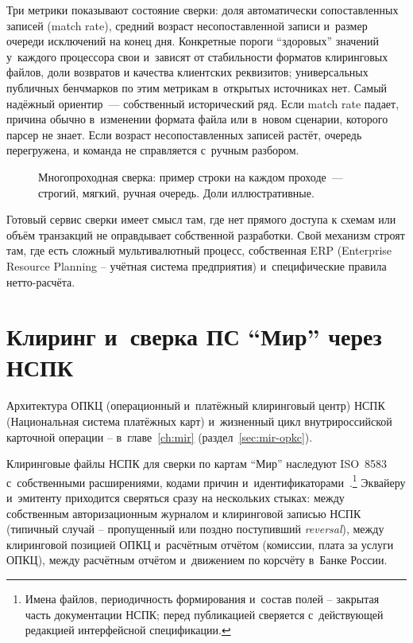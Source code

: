 Три метрики показывают состояние сверки: доля автоматически
сопоставленных записей (match rate), средний возраст
несопоставленной записи и~размер очереди исключений на конец
дня. Конкретные пороги \enquote{здоровых} значений у~каждого
процессора свои и~зависят от стабильности форматов клиринговых
файлов, доли возвратов и качества клиентских реквизитов;
универсальных публичных бенчмарков по этим метрикам в~открытых
источниках нет. Самый надёжный ориентир~--- собственный исторический
ряд. Если match rate падает, причина обычно в~изменении формата
файла или в~новом сценарии, которого парсер не знает. Если
возраст несопоставленных записей растёт, очередь перегружена,
и команда не справляется с~ручным разбором.

\begin{figure}[tbp]
  \centering
  \caption{Многопроходная сверка: пример строки на каждом проходе~--- строгий, мягкий, ручная очередь. Доли иллюстративные.}\label{fig:matching-passes}
\end{figure}

Готовый сервис сверки имеет смысл там, где нет прямого доступа к
схемам или объём транзакций не оправдывает собственной разработки.
Свой механизм строят там, где есть сложный мультивалютный
процесс, собственная ERP (Enterprise Resource Planning -- учётная
система предприятия) и~специфические правила нетто-расчёта.


\section{Клиринг и~сверка ПС \enquote{Мир} через НСПК}\label{sec:recon-mir}

Архитектура ОПКЦ (операционный и~платёжный клиринговый центр) НСПК
(Национальная система платёжных карт) и~жизненный цикл внутрироссийской
карточной операции -- в~главе~\ref{ch:mir} (раздел~\ref{sec:mir-opkc}).

Клиринговые файлы НСПК для сверки по картам \enquote{Мир} наследуют ISO~8583 с~собственными расширениями, кодами причин и~идентификаторами~\cite{nspk-mir-rules}.\footnote{Имена файлов, периодичность формирования и~состав полей -- закрытая часть документации НСПК; перед публикацией сверяется с~действующей редакцией интерфейсной спецификации.} Эквайеру
и~эмитенту приходится сверяться сразу на нескольких стыках: между
собственным авторизационным журналом и клиринговой записью НСПК
(типичный случай -- пропущенный или поздно поступивший \textit{reversal}),
между клиринговой позицией ОПКЦ и~расчётным отчётом (комиссии, плата
за услуги ОПКЦ), между расчётным отчётом и~движением по корсчёту
в~Банке России.

